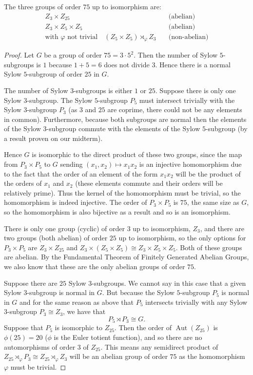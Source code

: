 \documentclass[11pt]{article}
\DeclareMathOperator\Aut{Aut}
\begin{document}
\begin{enumerate}
    The three groups of order $75$ up to isomorphism are: \begin{align*}
      Z_3 \times Z_{25} &\quad \text{(abelian)}\\
      Z_3 \times Z_5\times Z_5 &\quad \text{(abelian)}\\
      \text{with $\varphi$ not trivial} \quad (Z_5\times Z_5)\rtimes_{\varphi} Z_3 &\quad \text{(non-abelian)}
    \end{align*}
    \begin{proof}
      Let $G$ be a group of order $75 = 3\cdot 5^2$. Then the number of Sylow $5$-subgroups is $1$ because $1+ 5 = 6$ does not divide $3$. Hence there is a normal Sylow $5$-subgroup of order $25$ in $G$.

      The number of Sylow $3$-subgroups is either $1$ or $25$. Suppose there is only one Sylow $3$-subgroup. The Sylow $5$-subgroup $P_5$ must intersect trivially with the Sylow $3$-subgroup $P_3$ (as $3$ and $25$ are coprime, there could not be any elements in common). Furthermore, because both subgroups are normal then the elements of the Sylow $3$-subgroup commute with the elements of the Sylow $5$-subgroup (by a result proven on our midterm). 
      
      Hence $G$ is isomorphic to the direct product of these two groups, since the map from $P_3\times P_5$ to $G$ sending $(x_1,x_2)\mapsto x_1x_2$ is an injective homomorphism due to the fact that the order of an element of the form $x_1x_2$ will be the product of the orders of $x_1$ and $x_2$ (these elements commute and their orders will be relatively prime). Thus the kernel of the homomorphism must be trivial, so the homomorphism is indeed injective. The order of $P_3\times P_5$ is $75$, the same size as $G$, so the homomorphism is also bijective as a result and so is an isomorphism.
      
      There is only one group (cyclic) of order $3$ up to isomorphism, $Z_3$, and there are two groups (both abelian) of order $25$ up to isomorphism, so the only options for $P_3\times P_5$ are $Z_3 \times Z_{25}$ and $Z_3 \times (Z_5\times Z_5)\cong Z_3 \times Z_5\times Z_5$. Both of these groups are abelian. By the Fundamental Theorem of Finitely Generated Abelian Groups, we also know that these are the only abelian groups of order $75$.

      Suppose there are $25$ Sylow $3$-subgroups. We cannot say in this case that a given Sylow $3$-subgroup is normal in $G$. But because the Sylow $5$-subgroup $P_5$ is normal in $G$ and for the same reason as above that $P_5$ intersects trivially with any Sylow $3$-subgroup $P_3\cong Z_3$, we have that \[P_5\rtimes P_3 \cong G.\] Suppose that $P_5$ is isomorphic to $Z_{25}$. Then the order of $\Aut(Z_{25})$ is $\phi(25) = 20$ ($\phi$ is the Euler totient function), and so there are no automorphisms of order $3$ of $Z_{25}$. This means any semidirect product of $Z_{25}\rtimes_{\varphi} P_3 \cong Z_{25}\rtimes_{\varphi} Z_3$ will be an abelian group of order $75$ as the homomorphism $\varphi$ must be trivial.
      

\end{proof}
\end{enumerate}
\end{document}
